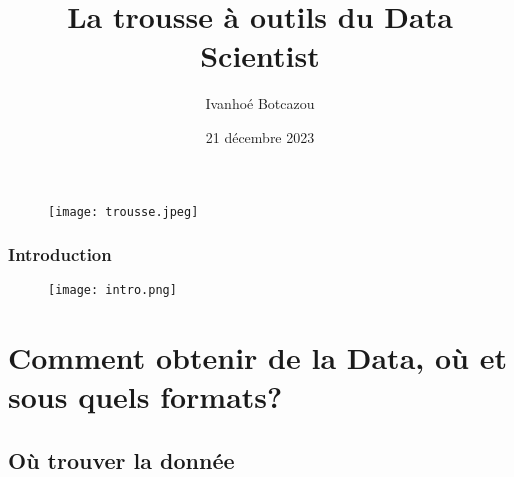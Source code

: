\documentclass{beamer}
\title{La trousse à outils du Data Scientist}
\date{21 décembre 2023}
\theoremstyle{definition}
\begin{document}
	
\begin{frame}[plain]
    \maketitle
   	\begin{figure}
   	\texttt{[image: trousse.jpeg]}
	\end{figure}
\end{frame}

\author{Ivanhoé Botcazou}

\begin{frame}[plain]
\frametitle{Introduction}
\begin{figure}
	\centering
	\texttt{[image: intro.png]}
\end{figure}
\end{frame}

\begin{frame}
	\tableofcontents

\end{frame}

\section{Comment obtenir de la Data, où et sous quels formats?}
\subsection{Où trouver la donnée}
\end{document}
